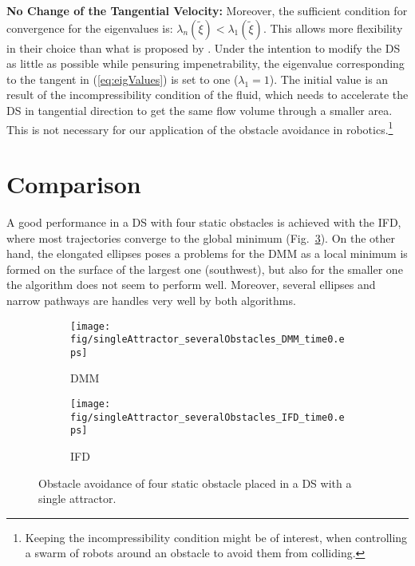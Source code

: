 \vspace{1ex} \noindent
\textbf{No Change of the Tangential Velocity:}
Moreover, the sufficient condition for convergence for the eigenvalues is:  $\lambda_n(\tilde \xi) < \lambda_1 (\tilde \xi)$. This allows more flexibility in their choice than what is proposed by \cite{khansari2012dynamical,}. Under the intention to modify the DS as little as possible while pensuring impenetrability, the eigenvalue corresponding to the tangent in (\ref{eq:eigValues}) is set to one ($\lambda_1 = 1$). The initial value is an result of the incompressibility condition of the fluid,  which needs to accelerate the DS in tangential direction to get the same flow volume through a smaller area. This is not necessary for our application of the obstacle avoidance in robotics.\footnote{Keeping the incompressibility condition might be of interest, when controlling a swarm of robots around an obstacle to avoid them from colliding.}


\section{Comparison}
A good performance in a DS with four static obstacles is achieved with the IFD, where most trajectories converge to the global minimum (Fig.~\ref{fig:singleAttractor_severalObstacles_time}). On the other hand, the elongated ellipses poses a problems for the DMM as a local minimum is formed on the surface of the largest one (southwest), but also for the smaller one the algorithm does not seem to perform well. Moreover, several ellipses and narrow pathways are handles very well by both algorithms.
\begin{figure}[tb]\centering
\begin{subfigure}{.48\columnwidth} %
\centering
\texttt{[image: fig/singleAttractor\_severalObstacles\_DMM\_time0.eps]}
\caption{DMM}
\label{fig:singleAttractor_severalObstacles_DMM_time0}
\end{subfigure}%
\begin{subfigure}{.48\columnwidth} %
\centering
\texttt{[image: fig/singleAttractor\_severalObstacles\_IFD\_time0.eps]}
\caption{IFD}
\label{fig:singleAttractor_severalObstacles_IFD_time0}
\end{subfigure}
\caption{Obstacle avoidance of four static obstacle placed in a DS with a single attractor.}
\label{fig:singleAttractor_severalObstacles_time}
\end{figure}

